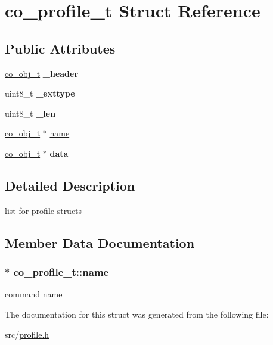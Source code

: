 \hypertarget{structco__profile__t}{\section{co\+\_\+profile\+\_\+t Struct Reference}
\label{structco__profile__t}
}
\subsection*{Public Attributes}
\begin{DoxyCompactItemize}
\item 
\hypertarget{structco__profile__t_a54173fb6eaad645f5eb5c2388aeafb70}{\hyperlink{structco__obj__t}{co\+\_\+obj\+\_\+t} {\bfseries \+\_\+header}}\label{structco__profile__t_a54173fb6eaad645f5eb5c2388aeafb70}

\item 
\hypertarget{structco__profile__t_acf749a11bc61f837586be5b493385b0d}{uint8\+\_\+t {\bfseries \+\_\+exttype}}\label{structco__profile__t_acf749a11bc61f837586be5b493385b0d}

\item 
\hypertarget{structco__profile__t_a84137c8167867e38b8b775a9fed599e8}{uint8\+\_\+t {\bfseries \+\_\+len}}\label{structco__profile__t_a84137c8167867e38b8b775a9fed599e8}

\item 
\hyperlink{structco__obj__t}{co\+\_\+obj\+\_\+t} $\ast$ \hyperlink{structco__profile__t_ab13ad349b42cf5d5a7e1f44f783130cc}{name}
\item 
\hypertarget{structco__profile__t_a5a256293b7d272d8f257c065f004ff61}{\hyperlink{structco__obj__t}{co\+\_\+obj\+\_\+t} $\ast$ {\bfseries data}}\label{structco__profile__t_a5a256293b7d272d8f257c065f004ff61}

\end{DoxyCompactItemize}


\subsection{Detailed Description}
list for profile structs 

\subsection{Member Data Documentation}
\hypertarget{structco__profile__t_ab13ad349b42cf5d5a7e1f44f783130cc}{
\subsubsection[{name}]{$\ast$ co\+\_\+profile\+\_\+t\+::name}}\label{structco__profile__t_ab13ad349b42cf5d5a7e1f44f783130cc}
command name 

The documentation for this struct was generated from the following file\+:\begin{DoxyCompactItemize}
\item 
src/\hyperlink{profile_8h}{profile.\+h}\end{DoxyCompactItemize}
